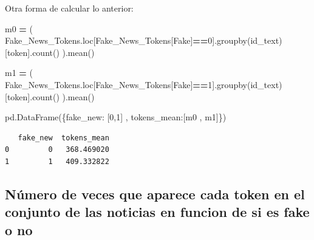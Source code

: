 \documentclass[
  11pt,
  a4paper,
]{article}
\newenvironment{Shaded}{\begin{snugshade}}{\end{snugshade}}
\newcommand{\DecValTok}[1]{\textcolor[rgb]{0.00,0.00,0.81}{#1}}
\newcommand{\NormalTok}[1]{#1}
\newcommand{\OperatorTok}[1]{\textcolor[rgb]{0.81,0.36,0.00}{\textbf{#1}}}
\newcommand{\StringTok}[1]{\textcolor[rgb]{0.31,0.60,0.02}{#1}}
\begin{document}
Otra forma de calcular lo anterior:

\begin{Shaded}
\begin{Highlighting}[]
\NormalTok{m0 }\OperatorTok{=}\NormalTok{ ( Fake\_News\_Tokens.loc[Fake\_News\_Tokens[}\StringTok{\textquotesingle{}Fake\textquotesingle{}}\NormalTok{]}\OperatorTok{==}\DecValTok{0}\NormalTok{].groupby(}\StringTok{\textquotesingle{}id\_text\textquotesingle{}}\NormalTok{)[}\StringTok{\textquotesingle{}token\textquotesingle{}}\NormalTok{].count() ).mean()}
\end{Highlighting}
\end{Shaded}

\begin{Shaded}
\begin{Highlighting}[]
\NormalTok{m1 }\OperatorTok{=}\NormalTok{ ( Fake\_News\_Tokens.loc[Fake\_News\_Tokens[}\StringTok{\textquotesingle{}Fake\textquotesingle{}}\NormalTok{]}\OperatorTok{==}\DecValTok{1}\NormalTok{].groupby(}\StringTok{\textquotesingle{}id\_text\textquotesingle{}}\NormalTok{)[}\StringTok{\textquotesingle{}token\textquotesingle{}}\NormalTok{].count() ).mean()}
\end{Highlighting}
\end{Shaded}

\begin{Shaded}
\begin{Highlighting}[]
\NormalTok{pd.DataFrame(\{}\StringTok{\textquotesingle{}fake\_new\textquotesingle{}}\NormalTok{: [}\DecValTok{0}\NormalTok{,}\DecValTok{1}\NormalTok{] , }\StringTok{\textquotesingle{}tokens\_mean\textquotesingle{}}\NormalTok{:[m0 , m1]\})}
\end{Highlighting}
\end{Shaded}

\begin{verbatim}
   fake_new  tokens_mean
0         0   368.469020
1         1   409.332822
\end{verbatim}

\hypertarget{nuxfamero-de-veces-que-aparece-cada-token-en-el-conjunto-de-las-noticias-en-funcion-de-si-es-fake-o-no}{%
\subsection{Número de veces que aparece cada token en el conjunto de las
noticias en funcion de si es fake o
no}\label{nuxfamero-de-veces-que-aparece-cada-token-en-el-conjunto-de-las-noticias-en-funcion-de-si-es-fake-o-no}}
\end{document}
